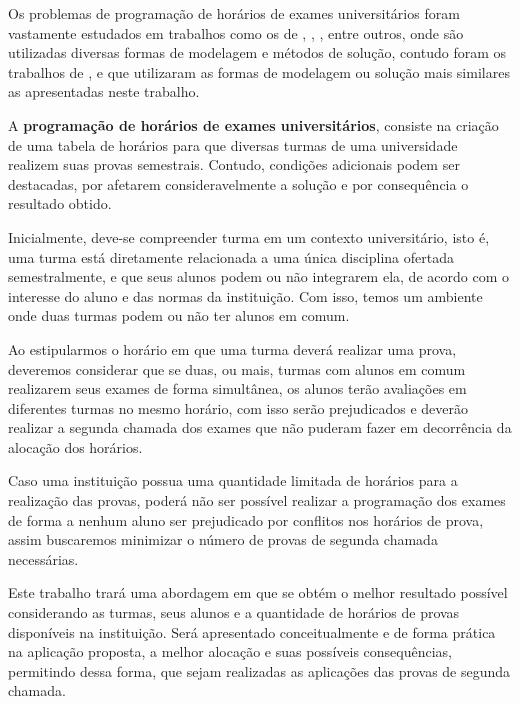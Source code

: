 Os problemas de programação de horários de exames universitários foram vastamente estudados em trabalhos como os de , , ,  entre outros, onde são utilizadas diversas formas de modelagem e métodos de solução, contudo foram os trabalhos de ,  e  que utilizaram as formas de modelagem ou solução mais similares as apresentadas neste trabalho.


A \textbf{programação de horários de exames universitários}, consiste na criação de uma tabela de horários para que diversas turmas de uma universidade realizem suas provas semestrais. Contudo, condições adicionais podem ser destacadas, por afetarem consideravelmente a solução e por consequência o resultado obtido.

Inicialmente, deve-se compreender turma em um contexto universitário, isto é, uma turma está diretamente relacionada a uma única disciplina ofertada semestralmente, e que seus alunos podem ou não integrarem ela, de acordo com o interesse do aluno e das normas da instituição. Com isso, temos um ambiente onde duas turmas podem ou não ter alunos em comum.

Ao estipularmos o horário em que uma turma deverá realizar uma prova, deveremos considerar que se duas, ou mais, turmas com alunos em comum realizarem seus exames de forma simultânea, os alunos terão avaliações em diferentes turmas no mesmo horário, com isso serão prejudicados e deverão realizar a segunda chamada dos exames que não puderam fazer em decorrência da alocação dos horários.

Caso uma instituição possua uma quantidade limitada de horários para a realização das provas, poderá não ser possível realizar a programação dos exames de forma a nenhum aluno ser prejudicado por conflitos nos horários de prova, assim buscaremos minimizar o número de provas de segunda chamada necessárias.



Este trabalho trará uma abordagem em que se obtém o melhor resultado possível considerando as turmas, seus alunos e a quantidade de horários de provas disponíveis na instituição. Será apresentado conceitualmente e de forma prática na aplicação proposta, a melhor alocação e suas possíveis consequências, permitindo dessa forma, que sejam realizadas as aplicações das provas de segunda chamada.



